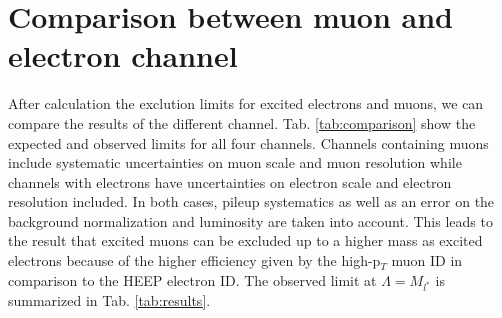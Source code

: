 \section{Comparison between muon and electron channel}

After calculation the exclution limits for excited electrons and muons, we can compare the results of the different channel. Tab. \ref{tab:comparison} show the expected and observed limits for all four channels. Channels containing muons include systematic uncertainties on muon scale and muon resolution while channels with electrons have uncertainties on electron scale and electron resolution included. In both cases, pileup systematics as well as an error on the background normalization and luminosity are taken into account. This leads to the result that excited muons can be excluded up to a higher mass as excited electrons because of the higher efficiency given by the high-p$_{T}$ muon ID in comparison to the HEEP electron ID. The observed limit at $\Lambda = M_{l^{*}}$ is summarized in Tab. \ref{tab:results}. 


